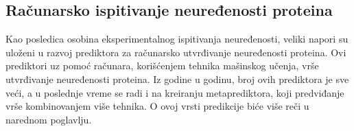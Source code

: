 \subsection{Računarsko ispitivanje neuređenosti proteina}

Kao posledica osobina eksperimentalnog ispitivanja neuređenosti, veliki napori su uloženi u razvoj prediktora za računarsko utvrđivanje neuređenosti proteina. Ovi prediktori uz pomoć računara, korišćenjem tehnika mašinskog učenja, vrše utvrđivanje neuređenosti proteina. Iz godine u godinu, broj ovih prediktora je sve veći, a u poslednje vreme se radi i na kreiranju metaprediktora, koji predviđanje vrše kombinovanjem više tehnika. O ovoj vrsti predikcije biće više reči u narednom poglavlju.\\
